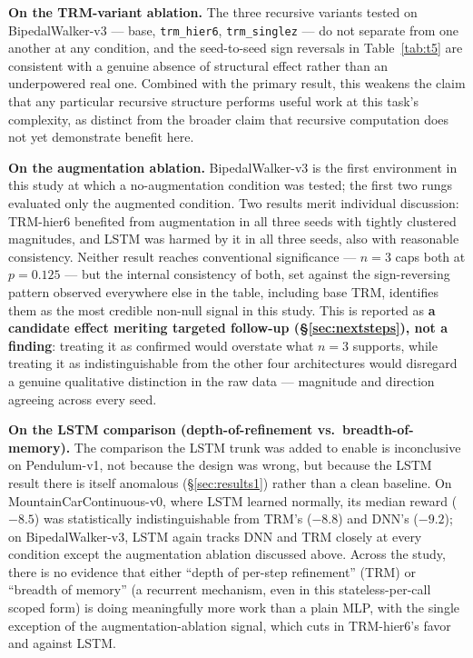 \documentclass[11pt]{article}
\begin{document}
\textbf{On the TRM-variant ablation.} The three recursive variants tested on BipedalWalker-v3 --- base, \texttt{trm\_hier6}, \texttt{trm\_singlez} --- do not separate from one another at any condition, and the seed-to-seed sign reversals in Table~\ref{tab:t5} are consistent with a genuine absence of structural effect rather than an underpowered real one. Combined with the primary result, this weakens the claim that any particular recursive structure performs useful work at this task's complexity, as distinct from the broader claim that recursive computation does not yet demonstrate benefit here.

\textbf{On the augmentation ablation.} BipedalWalker-v3 is the first environment in this study at which a no-augmentation condition was tested; the first two rungs evaluated only the augmented condition. Two results merit individual discussion: TRM-hier6 benefited from augmentation in all three seeds with tightly clustered magnitudes, and LSTM was harmed by it in all three seeds, also with reasonable consistency. Neither result reaches conventional significance --- $n=3$ caps both at $p=0.125$ --- but the internal consistency of both, set against the sign-reversing pattern observed everywhere else in the table, including base TRM, identifies them as the most credible non-null signal in this study. This is reported as \textbf{a candidate effect meriting targeted follow-up (\S\ref{sec:nextsteps}), not a finding}: treating it as confirmed would overstate what $n=3$ supports, while treating it as indistinguishable from the other four architectures would disregard a genuine qualitative distinction in the raw data --- magnitude and direction agreeing across every seed.

\textbf{On the LSTM comparison (depth-of-refinement vs.\ breadth-of-memory).} The comparison the LSTM trunk was added to enable is inconclusive on Pendulum-v1, not because the design was wrong, but because the LSTM result there is itself anomalous (\S\ref{sec:results1}) rather than a clean baseline. On MountainCarContinuous-v0, where LSTM learned normally, its median reward ($-8.5$) was statistically indistinguishable from TRM's ($-8.8$) and DNN's ($-9.2$); on BipedalWalker-v3, LSTM again tracks DNN and TRM closely at every condition except the augmentation ablation discussed above. Across the study, there is no evidence that either ``depth of per-step refinement'' (TRM) or ``breadth of memory'' (a recurrent mechanism, even in this stateless-per-call scoped form) is doing meaningfully more work than a plain MLP, with the single exception of the augmentation-ablation signal, which cuts in TRM-hier6's favor and against LSTM.
\end{document}
